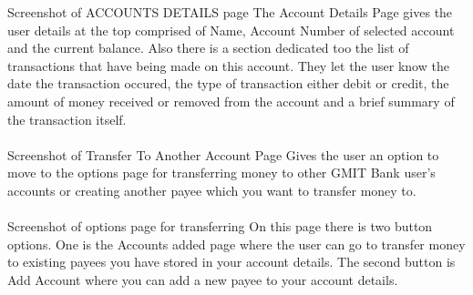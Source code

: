 Screenshot of ACCOUNTS DETAILS page
The Account Details Page gives the user details at the top comprised of Name, Account Number of selected account and the current balance. Also there is a section dedicated too the list of transactions that have being made on this account. They let the user know the date the transaction occured, the type of transaction either debit or credit, the amount of money received or removed from the account and a brief summary of the transaction itself.\paragraph{}

Screenshot of Transfer To Another Account Page
Gives the user an option to move to the options page for transferring money to other GMIT Bank user’s accounts or creating another payee which you want to transfer money to.\paragraph{}

Screenshot of options page for transferring
On this page there is two button options. One is the Accounts added page where the user can go to transfer money to existing payees you have stored in your account details. The second button is Add Account where you can add a new payee to your account details.\paragraph{}

